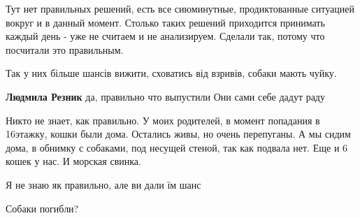  
 
 
 
 

\qqSecCmt


Тут нет правильных решений, есть все сиюминутные, продиктованные ситуацией
вокруг и в данный момент. Столько таких решений приходится принимать каждый
день - уже не считаем и не анализируем. Сделали так, потому что посчитали это
правильным.


Так у них більше шансів вижити, сховатись від взривів, собаки мають чуйку.

\begin{itemize} %
\textbf{Людмила Резник} да, правильно что выпустили
Они сами себе дадут раду
\end{itemize} %


Никто не знает, как правильно. У моих родителей, в момент попадания в 16этажку,
кошки были дома. Остались живы, но очень перепуганы. А мы сидим дома, в обнимку
с собаками, под несущей стеной, так как подвала нет. Еще и 6 кошек у нас. И
морская свинка.


Я не знаю як правильно, але ви дали їм шанс


Собаки погибли?

